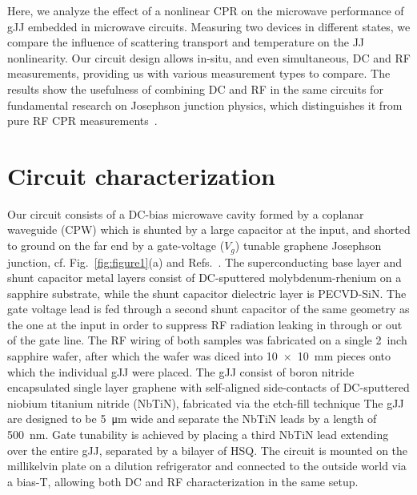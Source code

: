 Here, we analyze the effect of a nonlinear CPR on the microwave performance of gJJ embedded in microwave circuits.
%
Measuring two devices in different states, we compare the influence of scattering transport and temperature on the JJ nonlinearity.
%
Our circuit design allows in-situ, and even simultaneous, DC and RF measurements, providing us with various measurement types to compare.
%
The results show the usefulness of combining DC and RF in the same circuits for fundamental research on Josephson junction physics, which distinguishes it from pure RF CPR measurements~\cite{rifkinCurrentphaseRelationPhasedependent1976}.

\section{Circuit characterization}

Our circuit consists of a DC-bias microwave cavity formed by a coplanar waveguide (CPW) which is shunted by a large capacitor at the input, and shorted to ground on the far end by a gate-voltage ($V_g$) tunable graphene Josephson junction, cf. Fig.~\ref{fig:figure1}(a) and Refs.~\cite{schmidtBallisticGrapheneSuperconducting2018,schmidtCurrentDetectionUsing2020,bosmanBroadbandArchitectureGalvanically2015c}.
%
The superconducting base layer and shunt capacitor metal layers consist of DC-sputtered molybdenum-rhenium on a sapphire substrate, while the shunt capacitor dielectric layer is PECVD-SiN.
%
The gate voltage lead is fed through a second shunt capacitor of the same geometry as the one at the input in order to suppress RF radiation leaking in through or out of the gate line.
%
The RF wiring of both samples was fabricated on a single \SI{2}{inch} sapphire wafer, after which the wafer was diced into \SI{10x10}{\milli\meter} pieces onto which the individual gJJ were placed.
%
The gJJ consist of boron nitride encapsulated single layer graphene with self-aligned side-contacts of DC-sputtered niobium titanium nitride (NbTiN), fabricated via the etch-fill technique\cite{wangOneDimensionalElectricalContact2013b,schmidtBallisticGrapheneSuperconducting2018}
%
The gJJ are designed to be \SI{5}{\micro\meter} wide and separate the NbTiN leads by a length of \SI{500}{\nano\meter}.
%
Gate tunability is achieved by placing a third NbTiN lead extending over the entire gJJ, separated by a bilayer of HSQ.
%
The circuit is mounted on the millikelvin plate on a dilution refrigerator and connected to the outside world via a bias-T, allowing both DC and RF characterization in the same setup.


